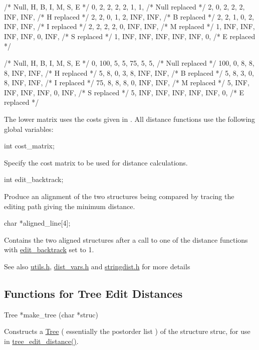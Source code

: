 \begin{DoxyVerb}/*  Null,   H,   B,   I,   M,   S,   E    */
   {   0,   2,   2,   2,   2,   1,   1},   /* Null replaced */
   {   2,   0,   2,   2,   2, INF, INF},   /* H    replaced */
   {   2,   2,   0,   1,   2, INF, INF},   /* B    replaced */
   {   2,   2,   1,   0,   2, INF, INF},   /* I    replaced */
   {   2,   2,   2,   2,   0, INF, INF},   /* M    replaced */
   {   1, INF, INF, INF, INF,   0, INF},   /* S    replaced */
   {   1, INF, INF, INF, INF, INF,   0},   /* E    replaced */


/* Null,   H,   B,   I,   M,   S,   E   */
   {   0, 100,   5,   5,  75,   5,   5},   /* Null replaced */
   { 100,   0,   8,   8,   8, INF, INF},   /* H    replaced */
   {   5,   8,   0,   3,   8, INF, INF},   /* B    replaced */
   {   5,   8,   3,   0,   8, INF, INF},   /* I    replaced */
   {  75,   8,   8,   8,   0, INF, INF},   /* M    replaced */
   {   5, INF, INF, INF, INF,   0, INF},   /* S    replaced */
   {   5, INF, INF, INF, INF, INF,   0},   /* E    replaced */
\end{DoxyVerb}


The lower matrix uses the costs given in \cite{shapiro:1990}. All distance functions use the following global variables\+:

\begin{DoxyVerb}int  cost_matrix;
\end{DoxyVerb}
 Specify the cost matrix to be used for distance calculations.

\begin{DoxyVerb}int   edit_backtrack;
\end{DoxyVerb}
 Produce an alignment of the two structures being compared by tracing the editing path giving the minimum distance.

\begin{DoxyVerb}char *aligned_line[4];
\end{DoxyVerb}
 Contains the two aligned structures after a call to one of the distance functions with \hyperlink{dist__vars_8h_aa03194c513af6b860e7b33e370b82bdb}{edit\+\_\+backtrack} set to 1.

\begin{DoxySeeAlso}{See also}
\hyperlink{utils_8h}{utils.\+h}, \hyperlink{dist__vars_8h}{dist\+\_\+vars.\+h} and \hyperlink{stringdist_8h}{stringdist.\+h} for more details
\end{DoxySeeAlso}
\hypertarget{distance_measures_sec_tree_edit_distance}{}\subsection{Functions for Tree Edit Distances}\label{distance_measures_sec_tree_edit_distance}
\begin{DoxyVerb}Tree   *make_tree (char *struc)
\end{DoxyVerb}
 Constructs a \hyperlink{structTree}{Tree} ( essentially the postorder list ) of the structure \textquotesingle{}struc\textquotesingle{}, for use in \hyperlink{treedist_8h_a3b21f1925f7071f46d93431a835217bb}{tree\+\_\+edit\+\_\+distance()}.

